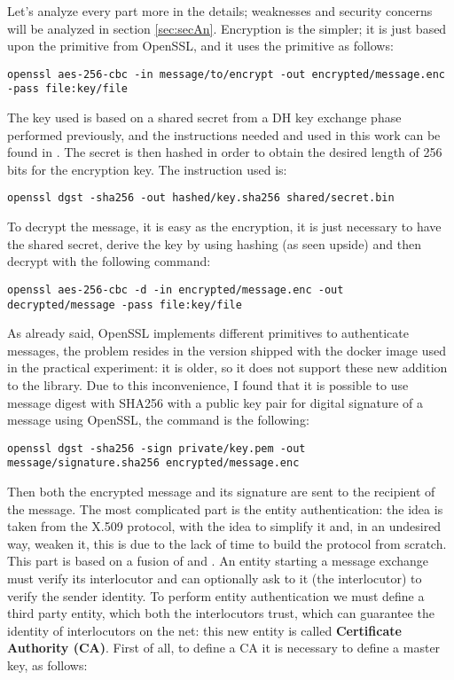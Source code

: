 \documentclass{article}
\begin{document}
Let's analyze every part more in the details; weaknesses and security concerns will be analyzed in section \ref{sec:secAn}.\newline
Encryption is the simpler; it is just based upon the primitive from OpenSSL, and it uses the primitive as follows: 

\begin{lstlisting}[breaklines]
openssl aes-256-cbc -in message/to/encrypt -out encrypted/message.enc -pass file:key/file
\end{lstlisting}

The key used is based on a shared secret from a DH key exchange phase performed previously, and the instructions needed and used in this work can be found in \cite{DHKE}. The secret is then hashed in order to obtain the desired length of 256 bits for the encryption key. The instruction used is:

\begin{lstlisting}[breaklines]
openssl dgst -sha256 -out hashed/key.sha256 shared/secret.bin
\end{lstlisting}

To decrypt the message, it is easy as the encryption, it is just necessary to have the shared secret, derive the key by using hashing (as seen upside) and then decrypt with the following command:

\begin{lstlisting}[breaklines]
openssl aes-256-cbc -d -in encrypted/message.enc -out decrypted/message -pass file:key/file
\end{lstlisting}
\label{ins:AES}

As already said, OpenSSL implements different primitives to authenticate messages, the problem resides in the version shipped with the docker image used in the practical experiment: it is older, so it does not support these new addition to the library. Due to this inconvenience, I found \cite{signatures} that it is possible to use message digest with SHA256 with a public key pair for digital signature of a message using OpenSSL, the command is the following:

\begin{lstlisting}[breaklines]
openssl dgst -sha256 -sign private/key.pem -out message/signature.sha256 encrypted/message.enc
\end{lstlisting}

Then both the encrypted message and its signature are sent to the recipient of the message. \newline
The most complicated part is the entity authentication: the idea is taken from the X.509 protocol, with the idea to simplify it and, in an undesired way, weaken it, this is due to the lack of time to build the protocol from scratch. This part is based on a fusion of \cite{certificates1} and \cite{certificates2}. An entity starting a message exchange must verify its interlocutor and can optionally ask to it (the interlocutor) to verify the sender identity. To perform entity authentication we must define a third party entity, which both the interlocutors trust, which can guarantee the identity of interlocutors on the net: this new entity is called \textbf{Certificate Authority (CA)}. First of all, to define a CA it is necessary to define a master key, as follows: 
\end{document}
